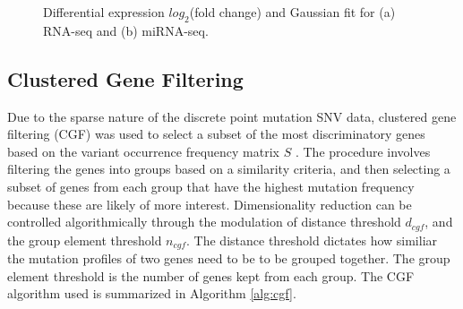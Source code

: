 \begin{figure}[h!]
     \centering
         \centering
     \hfill
         \centering
        \caption{Differential expression $log_2$(fold change) and Gaussian fit for (a) RNA-seq and (b) miRNA-seq.}
        \label{fig:deHist}
\end{figure}

\subsection{Clustered Gene Filtering}

Due to the sparse nature of the discrete point mutation SNV data, clustered gene filtering (CGF) was used to select a subset of the most discriminatory genes based on the variant occurrence frequency matrix $S$ \cite{yuan2016deepgene}. The procedure involves filtering the genes into groups based on a similarity criteria, and then selecting a subset of genes from each group that have the highest mutation frequency because these are likely of more interest. Dimensionality reduction can be controlled algorithmically through the modulation of distance threshold $d_{cgf}$, and the group element threshold $n_{cgf}$. The distance threshold dictates how similiar the mutation profiles of two genes need to be to be grouped together. The group element threshold is the number of genes kept from each group. The CGF algorithm used is summarized in Algorithm \ref{alg:cgf}.


